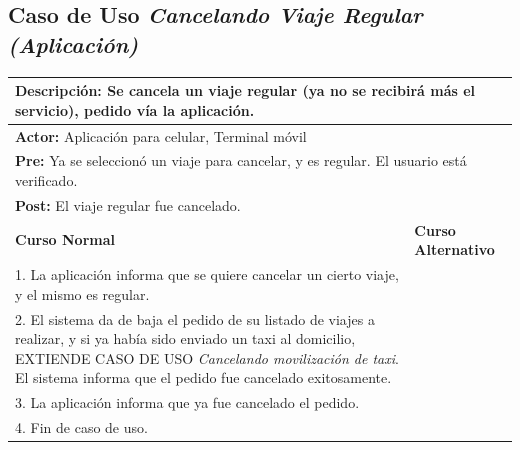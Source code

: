 \documentclass[a4paper]{article}
\begin{document}
\subsection{Caso de Uso \textit{Cancelando Viaje Regular (Aplicaci\'on)}}
\begin{center}
\begin{tabular}{|p{10cm} | p{6cm}|}
\hline
\multicolumn{2}{|p{16cm}|}{\textbf{Descripci\'on:} Se cancela un viaje regular (ya no se recibir\'a m\'as el servicio), pedido v\'ia la aplicaci\'on. } \\
\hline
\multicolumn{2}{|l|}{\textbf{Actor:} Aplicaci\'on para celular, Terminal m\'ovil} \\
\hline
\multicolumn{2}{|l|}{\textbf{Pre:} Ya se seleccion\'o un viaje para cancelar, y es regular. El usuario est\'a verificado.} \\
\hline
\multicolumn{2}{|p{16cm}|}{\textbf{Post:} El viaje regular fue cancelado.}\\
\hline
\textbf{Curso Normal}  & \textbf{Curso Alternativo} \\ \hline
1. La aplicaci\'on informa que se quiere cancelar un cierto viaje, y el mismo es regular. & \\ \hline
2. El sistema da de baja el pedido de su listado de viajes a realizar, y si ya hab\'ia sido enviado un taxi al domicilio, EXTIENDE CASO DE USO \textit{Cancelando movilizaci\'on de taxi}. El sistema informa que el pedido fue cancelado exitosamente. & \\ \hline
3. La aplicaci\'on informa que ya fue cancelado el pedido. & \\ \hline
4. Fin de caso de uso. & \\ \hline
\end{tabular}
\end{center}
\end{document}

